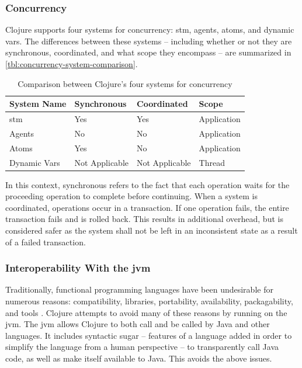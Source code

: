 		\subsubsection{Concurrency}
			Clojure supports four systems for concurrency:  \gls{stm}, agents, atoms, and dynamic vars.  The differences between these systems -- including whether or not they are synchronous, coordinated, and what scope they encompass -- are summarized in \vref{tbl:concurrency-system-comparison}.
			
			\begin{table}
				\centering
				
				\begin{tabular}{llll}
					\toprule
					System Name & Synchronous & Coordinated & Scope \\
					\midrule
					\gls{stm} & Yes & Yes & Application \\
					Agents & No & No & Application \\
					Atoms & Yes & No & Application \\
					Dynamic Vars & Not Applicable & Not Applicable & Thread \\
					\bottomrule
				\end{tabular}
				
				\caption{Comparison between Clojure's four systems for concurrency}
				\label{tbl:concurrency-system-comparison}
			\end{table}
			
			In this context, synchronous refers to the fact that each operation waits for the proceeding operation to complete before continuing.  When a system is coordinated, operations occur in a transaction.  If one operation fails, the entire transaction fails and is rolled back.  This results in additional overhead, but is considered safer as the system shall not be left in an inconsistent state as a result of a failed transaction.
			
			
		\subsubsection{Interoperability With the \gls{jvm}}
			Traditionally, functional programming languages have been undesirable for numerous reasons:  compatibility, libraries, portability, availability, packagability, and tools \cite{no-fp-98}.  Clojure attempts to avoid many of these reasons by running on the \gls{jvm}.  The \gls{jvm} allows Clojure to both call and be called by Java and other languages.  It includes syntactic sugar -- features of a language added in order to simplify the language from a human perspective -- to transparently call Java code, as well as make itself available to Java.  This avoids the above issues.
			
